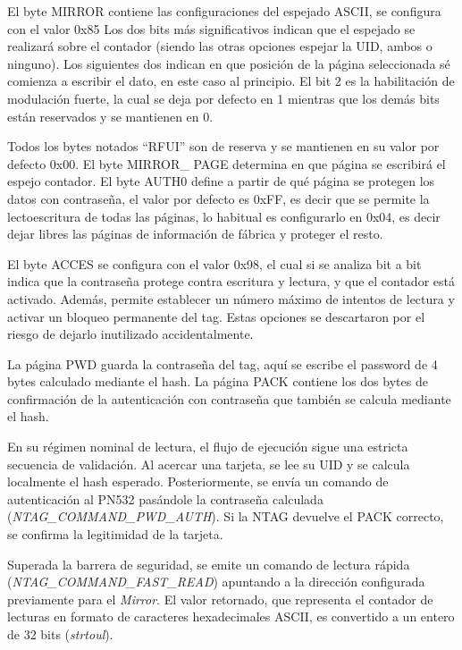 El byte MIRROR contiene las configuraciones del espejado ASCII,  se configura con el valor 0x85  Los dos bits más significativos indican que el espejado se realizará sobre el contador (siendo las otras opciones espejar la UID, ambos o ninguno). Los siguientes dos indican en que posición de la página seleccionada sé  comienza a escribir el dato, en este caso al principio. El bit 2 es la habilitación de modulación fuerte, la cual se deja por defecto en 1 mientras que los demás bits están reservados y se mantienen en 0.

Todos los bytes notados \enquote{RFUI} son de reserva y se mantienen en su valor por defecto 0x00.
El byte MIRROR\_ PAGE determina en que página se escribirá el espejo contador.
El byte AUTH0 define a partir de qué página se protegen los datos con contraseña, el valor por defecto es 0xFF, es decir que se permite la lectoescritura de todas las páginas, lo habitual es configurarlo en 0x04, es decir dejar libres las páginas de información de fábrica y proteger el resto.

El byte ACCES se configura con el valor 0x98, el cual si se analiza  bit a bit indica que la contraseña protege contra escritura y lectura, y que el contador está activado. Además, permite establecer un número máximo de intentos de lectura y activar un bloqueo permanente del tag. Estas opciones se descartaron por el riesgo de dejarlo inutilizado accidentalmente.

La página PWD guarda la contraseña del tag, aquí se escribe el password de 4 bytes calculado mediante el hash. La página PACK contiene los dos bytes de confirmación de la autenticación con contraseña que también se calcula mediante el hash.




En su régimen nominal de lectura, el flujo de ejecución sigue una estricta secuencia de validación. Al acercar una tarjeta, se lee su UID y se calcula localmente el hash esperado. Posteriormente, se envía un comando de autenticación al PN532 pasándole la contraseña calculada (\textit{NTAG\_COMMAND\_PWD\_AUTH}). Si la NTAG devuelve el PACK correcto, se confirma la legitimidad de la tarjeta.

Superada la barrera de seguridad, se emite un comando de lectura rápida (\textit{NTAG\_COMMAND\_FAST\_READ}) apuntando a la dirección configurada previamente para el \textit{Mirror}. El valor retornado, que representa el contador de lecturas en formato de caracteres hexadecimales ASCII, es convertido a un entero de 32 bits (\textit{strtoul}). 

